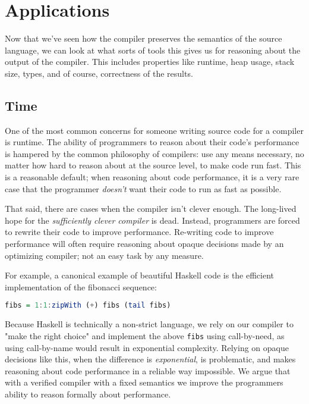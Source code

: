 \section{Applications} \label{sec:applications}

Now that we've seen how the compiler preserves the semantics of the source
language, we can look at what sorts of tools this gives us for reasoning about
the output of the compiler. This includes properties like runtime, heap usage,
stack size, types, and of course, correctness of the results.

\subsection{Time}

One of the most common concerns for someone writing source code for a compiler
is runtime. The ability of programmers to reason about their code's performance
is hampered by the common philosophy of compilers: use any means necessary, no
matter how hard to reason about at the source level, to make code run fast. This
is a reasonable default; when reasoning about code performance, it is a very
rare case that the programmer \emph{doesn't} want their code to run as fast as
possible. 

That said, there are cases when the compiler isn't clever enough. The long-lived
hope for the \emph{sufficiently clever compiler} is dead. Instead, programmers
are forced to rewrite their code to improve performance. Re-writing code to
improve performance will often require reasoning about opaque decisions made by
an optimizing compiler; not an easy task by any measure.

For example, a canonical example of beautiful Haskell code is the efficient
implementation of the fibonacci sequence: 

\begin{lstlisting}[language=Haskell]
fibs = 1:1:zipWith (+) fibs (tail fibs)
\end{lstlisting}

Because Haskell is technically a non-strict language, we rely on our compiler to
"make the right choice" and implement the above \texttt{fibs} using
call-by-need, as using call-by-name would result in exponential complexity.
Relying on opaque decisions like this, when the difference is
\emph{exponential}, is problematic, and makes reasoning about code performance
in a reliable way impossible. We argue that with a verified compiler with a
fixed semantics we improve the programmers ability to reason formally about
performance. 

